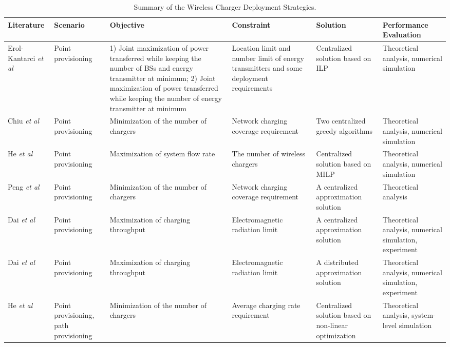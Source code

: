 \documentclass[twocolumn,10pt]{IEEEtran}
\begin{document}
\begin{table*}  \small \centering
\caption{\footnotesize Summary of the Wireless Charger Deployment Strategies.} \label{Deployment_Strategies}
\begin{tabular}{|p{1.4cm}|p{1.5cm}|p{4cm}|p{4cm}|p{2.1cm}|p{2.5cm}|}
\hline
\footnotesize {\bf Literature} & {\bf Scenario } & {\bf Objective} & {\bf Constraint } & {\bf Solution} & {\bf Performance Evaluation } \\ \hline
\hline
  Erol-Kantarci \emph{et al} \cite{Erol-Kantarci2014} & Point provisioning & 1) Joint maximization of power transferred while keeping the number of BSs and energy transmitter at minimum; 2) Joint maximization of power transferred while keeping the number of energy transmitter at minimum & Location limit and number limit of energy transmitters and some deployment requirements & Centralized solution based on ILP  & Theoretical analysis, numerical simulation \\
\hline
 Chiu \emph{et al} \cite{C2012Chiu}  & Point provisioning &  Minimization of the number of chargers & Network charging coverage requirement & Two centralized greedy algorithms & Theoretical analysis, numerical simulation \\
 \hline
 He \emph{et al}\cite{T.2015He} & Point provisioning &  Maximization of system flow rate & The number of wireless chargers & Centralized solution based on MILP & Theoretical analysis,  numerical simulation  \\
\hline
  Peng \emph{et al}  \cite{Y.2014Pang}  & Point provisioning & Minimization of the number of chargers &   Network charging coverage requirement  & A centralized approximation solution  & Theoretical analysis \\
 \hline
 Dai \emph{et al}  \cite{H.2014Dai} & Point provisioning & Maximization of charging throughput &  Electromagnetic radiation limit & A centralized approximation solution  &  Theoretical analysis, numerical simulation, experiment \\
 \hline
  Dai \emph{et al} \cite{HDai2014} & Point provisioning & Maximization of charging throughput &  Electromagnetic radiation limit & A distributed approximation solution  & Theoretical analysis, numerical simulation, experiment \\
\hline
 He \emph{et al} \cite{S2013He}  & Point provisioning, path provisioning &  Minimization of the number of chargers  &  Average charging rate requirement & Centralized solution based on non-linear optimization  & Theoretical analysis, system-level simulation\\

\end{tabular}
\end{table*}
\end{document}
